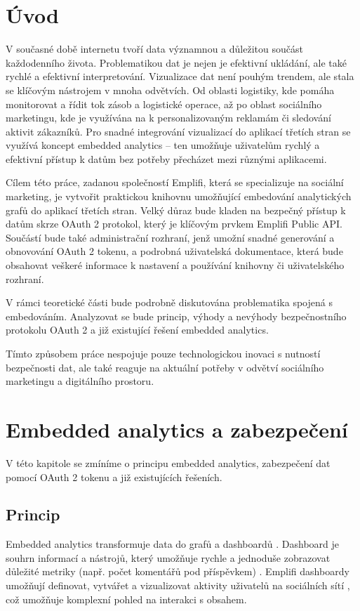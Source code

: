 \documentclass[czech, bc, kiv, he, iso690numb]{fasthesis}
\begin{document}
\chapter{Úvod}
V současné době internetu tvoří data významnou a důležitou součást každodenního života. Problematikou dat je nejen je efektivní ukládání, 
ale také rychlé a efektivní interpretování. 
Vizualizace dat není pouhým trendem, ale stala se klíčovým nástrojem v mnoha odvětvích. Od oblasti logistiky, kde pomáha monitorovat a řídit tok zásob a logistické operace, až po oblast sociálního marketingu, kde je využívána na k personalizovaným reklamám či sledování aktivit zákazníků. 
Pro snadné integrování vizualizací do aplikací třetích stran se využívá koncept embedded analytics – ten umožňuje uživatelům rychlý a efektivní přístup k datům bez potřeby přecházet mezi různými aplikacemi. 

Cílem této práce, zadanou společností Emplifi, která se specializuje na sociální marketing, je vytvořit praktickou knihovnu umožňující embedování analytických grafů do aplikací třetích stran. 
Velký důraz bude kladen na bezpečný přístup k datům skrze OAuth 2 protokol, který je klíčovým prvkem Emplifi Public API. Součástí bude také administrační rozhraní, jenž umožní snadné generování a obnovování OAuth 2 tokenu, a podrobná uživatelská dokumentace, která bude obsahovat veškeré informace k nastavení a používání knihovny či uživatelského rozhraní.

V rámci teoretické části bude podrobně diskutována problematika spojená s embedováním. Analyzovat se bude princip, výhody a nevýhody bezpečnostního protokolu OAuth 2 a již existující řešení embedded analytics.

Tímto způsobem práce nespojuje pouze technologickou inovaci s nutností bezpečnosti dat, ale také reaguje na aktuální potřeby v odvětví sociálního marketingu a digitálního prostoru.
%
%
%
%
\chapter{Embedded analytics a zabezpečení}
V této kapitole se zmíníme o principu embedded analytics, zabezpečení dat pomocí OAuth 2 tokenu a již existujících řešeních.

%
%
\section{Princip}
Embedded analytics transformuje data do grafů a dashboardů \cite{goodDataEmbedded}. Dashboard je souhrn informací a nástrojů, který umožňuje rychle a jednoduše zobrazovat důležité metriky (např. počet komentářů pod příspěvkem) \cite{coJeDashboard}.
Emplifi dashboardy umožňují definovat, vytvářet a vizualizovat aktivity uživatelů na sociálních sítí \cite{emplifiDashboard}, což umožňuje komplexní pohled na interakci s obsahem.
\end{document}
